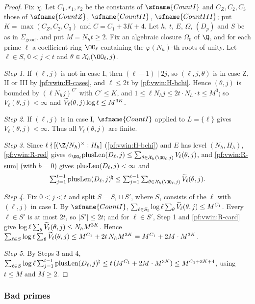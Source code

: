 \begin{proof}
Fix $\chi$. Let $C_1,r_1,r_2$ be the constants of $\sfname{CountI}$ and $C_Z,C_2,C_3$ those of $\sfname{CountZ}$,
$\sfname{CountII}$, $\sfname{CountIII}$; put $K=\max(C_Z,C_2,C_3)$ and $C=C_1+3K+4$. Let $h$, $t$, $E$, $\Omega$, $(D_p)$ and $S$
be as in $\Sigma_{\mathrm{good}}$, and put $M=N_ht\ge2$. Fix an algebraic closure $\Omega_0$ of $\Q$, and for each prime $\ell$ a
coefficient ring $\OO_\ell$ containing the $\varphi(N_h)$-th roots of unity. Let $\ell\in S$, $0<j<t$ and
$\theta\in\vwinX_h(\OO_\ell,j)$.

\emph{Step 1.} If $(\ell,j)$ is not in case I, then $(\ell-1)\mid2j$, so $(\ell,j,\theta)$ is in case Z, II or III by
\ref{pf:vwin:H-cases}, and $\ell\le2t$ by \ref{pf:vwin:H-bchi}. Hence $(\theta,j)$ is bounded by $(\ell N_hj)^{C'}$ with
$C'\le K$, and $1\le\ell N_hj\le2t\cdot N_h\cdot t\le M^3$; so $V_\ell(\theta,j)<\infty$ and
$\widetilde V_\ell(\theta,j)\log\ell\le M^{3K}$.

\emph{Step 2.} If $(\ell,j)$ is in case I, $\sfname{CountI}$ applied to $L=\{\ell\}$ gives $V_\ell(\theta,j)<\infty$. Thus all
$V_\ell(\theta,j)$ are finite.

\emph{Step 3.} Since $\ell\nmid[(\Z/N_h)^\times:H_h]$ (\ref{pf:vwin:H-bchi}) and $E$ has level $(N_h,H_h)$, \ref{pf:vwin:R-red}
gives $e_{\OO_\ell}\vwinplus(D_\ell,j)\le\sum_{\theta\in\vwinX_h(\OO_\ell,j)}V_\ell(\theta,j)$, and \ref{pf:vwin:R-sum} (with
$b=0$) gives $\mathrm{plusLen}(D_\ell,j)<\infty$ and
\[
\textstyle\sum_{j=1}^{t-1}\vwinplus(D_\ell,j)^\natural\le\sum_{j=1}^{t-1}\sum_{\theta\in\vwinX_h(\OO_\ell,j)}\vwinVt_\ell(\theta,j).
\]

\emph{Step 4.} Fix $0<j<t$ and split $S=S_{\mathrm I}\sqcup S'$, where $S_{\mathrm I}$ consists of the $\ell$ with $(\ell,j)$ in case I.
By $\sfname{CountI}$, $\sum_{\ell\in S_{\mathrm I}}\log\ell\sum_\theta\widetilde V_\ell(\theta,j)\le M^{C_1}$. Every $\ell\in S'$ is at most
$2t$, so $|S'|\le2t$; and for $\ell\in S'$, Step 1 and \ref{pf:vwin:R-card} give
$\log\ell\sum_\theta\widetilde V_\ell(\theta,j)\le N_hM^{3K}$. Hence
$\sum_{\ell\in S}\log\ell\sum_\theta\widetilde V_\ell(\theta,j)\le M^{C_1}+2t\,N_hM^{3K}=M^{C_1}+2M\cdot M^{3K}$.

\emph{Step 5.} By Steps 3 and 4,
$\sum_{\ell\in S}\log\ell\sum_{j=1}^{t-1}\mathrm{plusLen}(D_\ell,j)^\natural\le t\,(M^{C_1}+2M\cdot M^{3K})\le M^{C_1+3K+4}$, using
$t\le M$ and $M\ge2$.
\end{proof}

\subsubsection{Bad primes}

